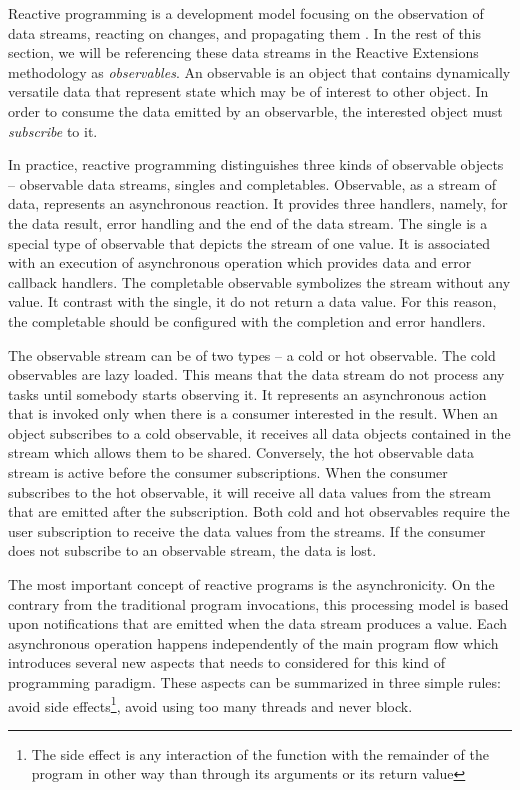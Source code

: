 \documentclass[oneside,
  digital, %
  table,   %
  nolof,     %
  nolot,     %
]{fithesis3}
\begin{document}
Reactive programming is a development model focusing on the observation of data streams, reacting on changes, and propagating them \cite{building_reactive_ms_in_java}. In the rest of this section, we will be referencing these data streams in the Reactive Extensions methodology as \textit{observables}. An observable is an object that contains dynamically versatile data that represent state which may be of interest to other object. In order to consume the data emitted by an observarble, the interested object must \textit{subscribe} to it.

In practice, reactive programming distinguishes three kinds of observable objects -- observable data streams, singles and completables. Observable, as a stream of data, represents an asynchronous reaction. It provides three handlers, namely, for the data result, error handling and the end of the data stream. The single is a special type of observable that depicts the stream of one value. It is associated with an execution of asynchronous operation which provides data and error callback handlers. The completable observable symbolizes the stream without any value. It contrast with the single, it do not return a data value. For this reason, the completable should be configured with the completion and error handlers.

The observable stream can be of two types -- a cold or hot observable. The cold observables are lazy loaded. This means that the data stream do not process any tasks until somebody starts observing it. It represents an asynchronous action that is invoked only when there is a consumer interested in the result. When an object subscribes to a cold observable, it receives all data objects contained in the stream which allows them to be shared. Conversely, the hot observable data stream is active before the consumer subscriptions. When the consumer subscribes to the hot observable, it will receive all data values from the stream that are emitted after the subscription. Both cold and hot observables require the user subscription to receive the data values from the streams. If the consumer does not subscribe to an observable stream, the data is lost.

The most important concept of reactive programs is the asynchronicity. On the contrary from the traditional program invocations, this processing model is based upon notifications that are emitted when the data stream produces a value. Each asynchronous operation happens independently of the main program flow which introduces several new aspects that needs to considered for this kind of programming paradigm. These aspects can be summarized in three simple rules: avoid side effects\footnote{The side effect is any interaction of the function with the remainder of the program in other way than through its arguments or its return value}, avoid using too many threads and never block.
\end{document}
